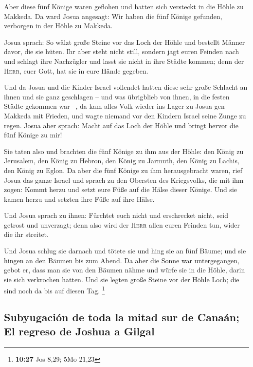  Aber diese fünf Könige waren geflohen und hatten sich
versteckt in die Höhle zu Makkeda.  Da ward Josua
angesagt: Wir haben die fünf Könige gefunden, verborgen in der Höhle zu
Makkeda.

 Josua sprach: So wälzt große Steine vor das Loch der
Höhle und bestellt Männer davor, die sie hüten.  Ihr aber
steht nicht still, sondern jagt euren Feinden nach und schlagt ihre
Nachzügler und lasst sie nicht in ihre Städte kommen; denn der
\textsc{Herr}, euer Gott, hat sie in eure Hände gegeben.

 Und da Josua und die Kinder Israel vollendet hatten
diese sehr große Schlacht an ihnen und sie ganz geschlagen -- und was
übrigblieb von ihnen, in die festen Städte gekommen war --,
 da kam alles Volk wieder ins Lager zu Josua gen Makkeda
mit Frieden, und wagte niemand vor den Kindern Israel seine Zunge zu
regen.  Josua aber sprach: Macht auf das Loch der Höhle
und bringt hervor die fünf Könige zu mir!

 Sie taten also und brachten die fünf Könige zu ihm aus
der Höhle: den König zu Jerusalem, den König zu Hebron, den König zu
Jarmuth, den König zu Lachis, den König zu Eglon.  Da
aber die fünf Könige zu ihm herausgebracht waren, rief Josua das ganze
Israel und sprach zu den Obersten des Kriegsvolks, die mit ihm zogen:
Kommt herzu und setzt eure Füße auf die Hälse dieser Könige. Und sie
kamen herzu und setzten ihre Füße auf ihre Hälse.

 Und Josua sprach zu ihnen: Fürchtet euch nicht und
erschrecket nicht, seid getrost und unverzagt; denn also wird der
\textsc{Herr} allen euren Feinden tun, wider die ihr streitet.

 Und Josua schlug sie darnach und tötete sie und hing sie
an fünf Bäume; und sie hingen an den Bäumen bis zum Abend.
 Da aber die Sonne war untergegangen, gebot er, dass man
sie von den Bäumen nähme und würfe sie in die Höhle, darin sie sich
verkrochen hatten. Und sie legten große Steine vor der Höhle Loch; die
sind noch da bis auf diesen Tag. \footnote{\textbf{10:27} Jos 8,29; 5Mo
  21,23}

\hypertarget{subyugaciuxf3n-de-toda-la-mitad-sur-de-canauxe1n-el-regreso-de-joshua-a-gilgal}{%
\subsection{Subyugación de toda la mitad sur de Canaán; El regreso de
Joshua a
Gilgal}\label{subyugaciuxf3n-de-toda-la-mitad-sur-de-canauxe1n-el-regreso-de-joshua-a-gilgal}}

